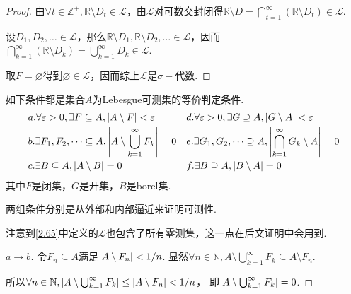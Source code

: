 \begin{proof}
    由\(\forall t \in \mathbb{Z}^+, \mathbb{R} \setminus D_t \in \mathcal{L}\)，由\(\mathcal{L}\)对可数交封闭得\(\mathbb{R} \setminus D=\bigcap_{t=1}^\infty (\mathbb{R} \setminus D_t) \in \mathcal{L}\).

    设\(D_1, D_2, \dots \in \mathcal{L}\)，那么\(\mathbb{R} \setminus D_1, \mathbb{R} \setminus D_2, \dots \in \mathcal{L}\)，因而\(\bigcap_{k=1}^\infty (\mathbb{R} \setminus D_k)=\bigcup_{k=1}^\infty D_k \in \mathcal{L}\).

    取\(F=\varnothing\)得到\(\varnothing \in \mathcal{L}\)，因而综上\(\mathcal{L}\)是\(\sigma-\)代数.
\end{proof}

\newpage

\begin{theorem}[2.71]\label{2.71}
    如下条件都是集合\(A\)为Lebesgue可测集的等价判定条件.
    \begin{equation*}
        \begin{array}{cc}
            \begin{aligned}
                &a.\forall \varepsilon>0, \exists F \subseteq A, \abs*{A \setminus F}<\varepsilon \\
                &b.\exists F_1, F_2, \dots \subseteq A, \abs*{A \setminus \bigcup_{k=1}^\infty F_k}=0 \\
                &c.\exists B \subseteq A, \abs*{A \setminus B}=0
            \end{aligned}
            &
            \begin{aligned}
                &d.\forall \varepsilon>0, \exists G \supseteq A, \abs*{G \setminus A}<\varepsilon \\
                &e.\exists G_1, G_2, \dots \supseteq A, \abs*{\bigcap_{k=1}^\infty G_k \setminus A}=0 \\
                &f.\exists B \supseteq A, \abs*{B \setminus A}=0
            \end{aligned}
        \end{array}
    \end{equation*}
    其中\(F\)是闭集，\(G\)是开集，\(B\)是borel集.
\end{theorem}

{\kaishu 两组条件分别是从外部和内部逼近来证明可测性.

注意到\cref{2.65}中定义的\(\mathcal{L}\)也包含了所有零测集，这一点在后文证明中会用到.}

\begin{proof}[\(a \to b\)]
    令\(F_n \subseteq A\)满足\(\abs*{A \setminus F_n}<1/n\).
    显然\(\forall n \in \mathbb{N}, A \setminus \bigcup_{k=1}^\infty F_k \subseteq A \setminus F_n\).

    所以\(\forall n \in \mathbb{N}, \abs*{A \setminus \bigcup_{k=1}^\infty F_k} \leq \abs*{A \setminus F_n}<1/n\)，
    即\(\abs*{A \setminus \bigcup_{k=1}^\infty F_k}=0\).
\end{proof}

